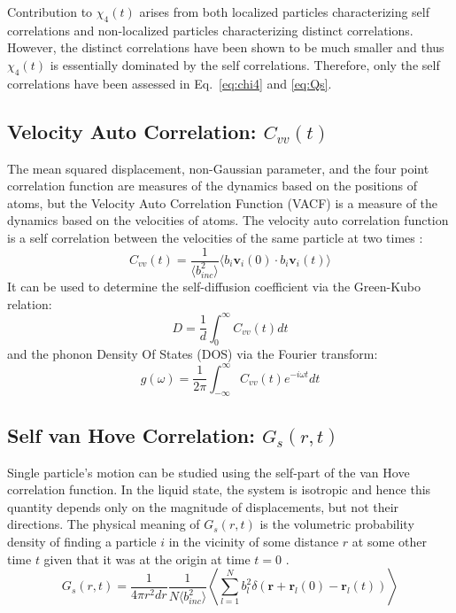 \documentclass{article}
\begin{document}
Contribution to $\chi_4(t)$ arises from both localized particles characterizing self correlations and non-localized particles characterizing distinct correlations. However, the distinct correlations have been shown to be much smaller and thus $\chi_4(t)$ is essentially dominated by the self correlations. Therefore, only the self correlations have been assessed in Eq.~\ref{eq:chi4} and \ref{eq:Qs}.

\subsection{Velocity Auto Correlation: $C_{vv}(t)$} \label{sec::VACF}
The mean squared displacement, non-Gaussian parameter, and the four point correlation function are measures of the dynamics based on the positions of atoms, but the Velocity Auto Correlation Function (VACF) is a measure of the dynamics based on the velocities of atoms. The velocity auto correlation function is a self correlation between the velocities of the same particle at two times \cite{EGELSTAFF, Hansen}:
\begin{equation}
	\label{eq:vacf}
	C_{vv}(t) = \frac{1}{\langle b_{inc}^2\rangle}\langle b_i\textbf{v}_i(0)\cdot b_i\textbf{v}_i(t)\rangle
\end{equation} 
It can be used to determine the self-diffusion coefficient via the Green-Kubo relation:
\begin{equation}
	D = \frac{1}{d} \int_0^\infty C_{vv}(t) dt
\end{equation}
and the phonon Density Of States (DOS) via the Fourier transform:
\begin{equation}
	g(\omega) = \frac{1}{2\pi} \int_{-\infty}^\infty C_{vv}(t) e^{-i\omega t} dt
\end{equation} 

\subsection{Self van Hove Correlation: $G_s(r,t)$} \label{sec::Gofrt}
Single particle's motion can be studied using the self-part of the van Hove correlation function. In the liquid state, the system is isotropic and hence this quantity depends only on the magnitude of displacements, but not their directions. The physical meaning of $G_s(r,t)$ is the volumetric probability density of finding a particle $i$ in the vicinity of some distance $r$ at some other time $t$ given that it was at the origin at time $t = 0$ \cite{EGELSTAFF, Hansen}.
\begin{equation}
	\label{eq:gr}
	G_s(r,t) = \frac{1}{4\pi r^2dr}\frac{1}{ N\langle b_{inc}^2\rangle}\left\langle\sum\limits_{l=1}^N b_l^2\delta(\mathbf{r}+\mathbf{r}_l(0)-\mathbf{r}_l(t))\right\rangle
\end{equation}
\end{document}

